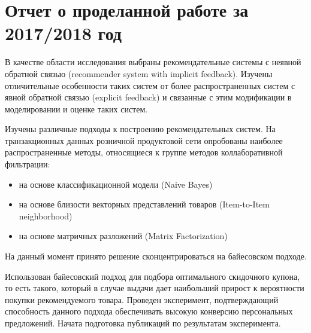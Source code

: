\documentclass[12pt, specialist, subf, substylefile = ../philosophy/spbu.rtx]{disser}
\begin{document}
\section*{Отчет о проделанной работе за 2017/2018 год}
В качестве области исследования выбраны рекомендательные системы с неявной обратной связью (recommender system with implicit feedback). Изучены отличительные особенности таких систем от более распространенных систем с явной обратной связью (explicit feedback) и связанные с этим модификации в моделировании и оценке таких систем.

Изучены различные подходы к построению рекомендательных систем. На транзакционных данных розничной продуктовой сети опробованы наиболее распространенные методы, относящиеся к группе методов коллаборативной фильтрации:
\begin{itemize}
	\item на основе классификационной модели (Naive Bayes)
	\item на основе близости векторных представлений товаров (Item-to-Item neighborhood)
	\item на основе матричных разложений (Matrix Factorization)
\end{itemize}
На данный момент принято решение сконцентрироваться на байесовском подходе.

Использован байесовский подход для подбора оптимального скидочного купона, то есть такого, который в случае выдачи дает наибольший прирост к вероятности покупки рекомендуемого товара. Проведен эксперимент, подтверждающий способность данного подхода обеспечивать высокую конверсию персональных предложений. Начата подготовка публикаций по результатам эксперимента.
\end{document}
